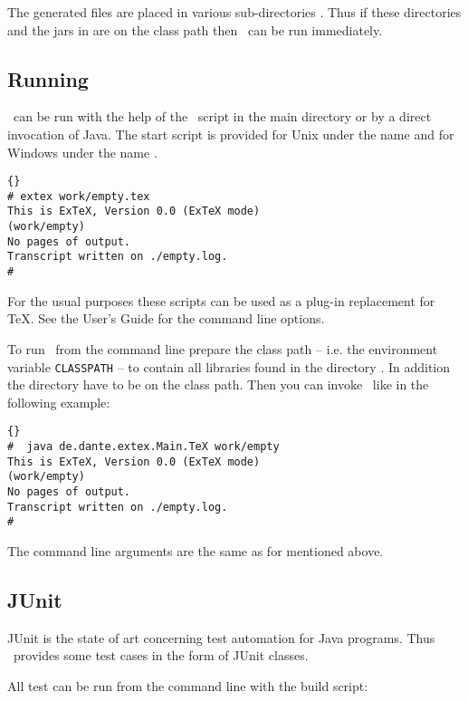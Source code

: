 The generated files are placed in various sub-directories
. Thus if these directories and the jars in
 are on the class path then \ExTeX\ can be run immediately.


\subsection{Running \ExTeX}

\ExTeX\ can be run with the help of the \ExTeX\ script in the main
directory or by a direct invocation of Java. The start script is
provided for Unix under the name  and for Windows under
the name .
\begin{lstlisting}{}
# extex work/empty.tex
This is ExTeX, Version 0.0 (ExTeX mode)
(work/empty)
No pages of output.
Transcript written on ./empty.log.
#
\end{lstlisting}{}

For the usual purposes these scripts can be used as a plug-in
replacement for \TeX. See the User's Guide for the command line
options.

To run \ExTeX\ from the command line prepare the class path -- i.e.
the environment variable \texttt{CLASSPATH} -- to contain all
libraries found in the directory . In addition the
directory  have to be on the class path.
Then you can invoke \ExTeX\ like in the following example:

\begin{lstlisting}{}
#  java de.dante.extex.Main.TeX work/empty
This is ExTeX, Version 0.0 (ExTeX mode)
(work/empty)
No pages of output.
Transcript written on ./empty.log.
#
\end{lstlisting}{}

The command line arguments are the same as for  mentioned
above.


\subsection{JUnit}\label{sec:shell-junit}

JUnit is the state of art concerning test automation for Java
programs. Thus \ExTeX\ provides some test cases in the form of JUnit
classes.

All test can be run from the command line with the build script:


